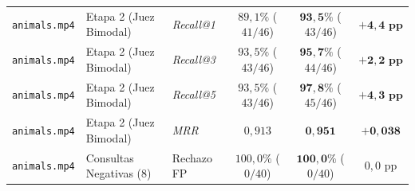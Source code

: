 \begin{table}[htbp]
\begin{tabular}{lllccc}
\texttt{animals.mp4} & Etapa 2 (Juez Bimodal) & \textit{Recall@1} & $89,1\%$ ($41/46$) & $\mathbf{93,5\%}$ ($43/46$) & $\mathbf{+4,4\text{ pp}}$ \\
\texttt{animals.mp4} & Etapa 2 (Juez Bimodal) & \textit{Recall@3} & $93,5\%$ ($43/46$) & $\mathbf{95,7\%}$ ($44/46$) & $\mathbf{+2,2\text{ pp}}$ \\
\texttt{animals.mp4} & Etapa 2 (Juez Bimodal) & \textit{Recall@5} & $93,5\%$ ($43/46$) & $\mathbf{97,8\%}$ ($45/46$) & $\mathbf{+4,3\text{ pp}}$ \\
\texttt{animals.mp4} & Etapa 2 (Juez Bimodal) & \textit{MRR} & $0,913$ & $\mathbf{0,951}$ & $\mathbf{+0,038}$ \\ \addlinespace[2.5pt]
\texttt{animals.mp4} & Consultas Negativas ($8$) & Rechazo FP & $100,0\%$ ($0/40$) & $\mathbf{100,0\%}$ ($0/40$) & $0,0\text{ pp}$ \\
\bottomrule
\end{tabular}
\end{table}

